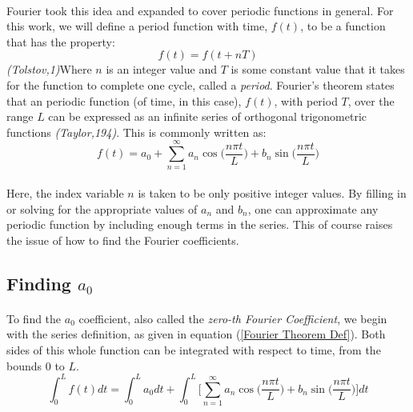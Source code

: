 \documentclass[12pt,letterpaper]{article}
\begin{document}
\paragraph*{}Fourier took this idea and expanded to cover periodic functions in general. For this work, we will define a period function with time, $f(t)$, to be a function that has the property:
\begin{equation}
\label{period def}
f(t) = f(t + nT)
\end{equation} 
\textit{(Tolstov,1)}Where $n$ is an integer value and $T$ is some constant value that it takes for the function to complete one cycle, called a \textit{period}.
Fourier's theorem states that an periodic function (of time, in this case), $f(t)$, with period $T$, over the range $L$ can be expressed as an infinite series of orthogonal trigonometric functions \textit{(Taylor,194)}. This is commonly written as:
\begin{equation}
\label{Fourier Theorem Def}
f(t) = a_0 + \sum_{n=1}^{\infty} a_n \cos\Big(\frac{n\pi t}{L}\Big) + b_n \sin\Big(\frac{n\pi t}{L}\Big)
\end{equation} 
\paragraph*{}Here, the index variable $n$ is taken to be only positive integer values. By filling in or solving for the appropriate values of $a_n$ and $b_n$, one can approximate any periodic function by including enough terms in the series. This of course raises the issue of how to find the Fourier coefficients.


\subsection{Finding $a_0$}
\paragraph*{}To find the $a_0$ coefficient, also called the \textit{zero-th Fourier Coefficient}, we begin with the series definition, as given in equation (\ref{Fourier Theorem Def}). Both sides of this whole function can be integrated with respect to time, from the bounds $0$ to $L$.
\begin{equation}
\label{step1}
\int_0^L f(t) dt = \int_0^L a_0 dt + 
\int_0^L \Bigg[ \sum_{n=1}^{\infty} a_n \cos\Big(\frac{n\pi t}{L}\Big) + 
b_n \sin\Big(\frac{n\pi t}{L}\Big) \Bigg] dt
\end{equation} 
\end{document}
